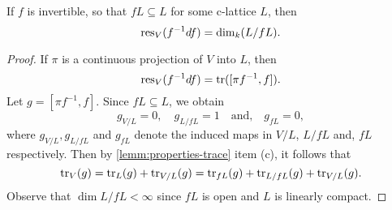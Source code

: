 \begin{proposition}\label{prop:residue-of-invertible-element}
	If $f$ is invertible, so that $fL \subseteq L$ for some c-lattice $L$, then
	\[
		\operatorname{res}_{V}(f^{-1}df) = \dim_{k}(L/fL).
	\]
\end{proposition}
\begin{proof}
	If $\pi$ is a continuous projection of $V$ into $L$, then 
	\[
	\operatorname{res}_{V}(f^{-1}df) = \operatorname{tr}([\pi f^{-1}, f]). 
	\]
	Let $g = [\pi f^{-1}, f]$. Since $fL\subseteq L$, we obtain
	\[
		g_{V/L} = 0, \quad g_{L/fL}= 1\quad\text{and,}\quad g_{fL} = 0, 
	\]
	where $g_{V/L}, g_{L/fL}$ and $g_{fL}$ denote the induced maps in $V/L$, $L/fL$ and, $fL$ respectively. Then by \cref{lemm:properties-trace} item (c), it follows that
	\[
		\operatorname{tr}_{V}(g) = \operatorname{tr}_{L}(g) + \operatorname{tr}_{V/L}(g) = \operatorname{tr}_{fL}(g) + \operatorname{tr}_{L/fL}(g) + \operatorname{tr}_{V/L}(g).
	\]
	Observe that $\dim L/fL < \infty$ since $fL$ is open and $L$ is linearly compact.
\end{proof}
